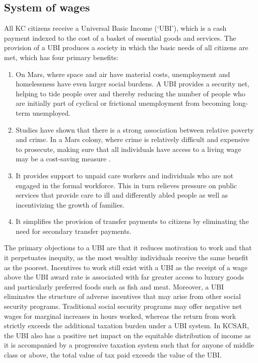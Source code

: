 \documentclass[fleqn,10pt]{Stylesheet} %
\begin{document}
\subsection{System of wages}
All KC citizens receive a Universal Basic Income (‘UBI’), which is a cash payment indexed to the cost of a basket of essential goods and services. The provision of a UBI produces a society in which the basic needs of all citizens are met, which has four primary benefits: 

\begin{enumerate}
    \item On Mars, where space and air have material costs, unemployment and homelessness have even larger social burdens. A UBI provides a security net, helping to tide people over and thereby reducing the number of people who are initially part of cyclical or frictional unemployment from becoming long-term unemployed.
    \item Studies have shown that there is a strong association between relative poverty and crime. In a Mars colony, where crime is relatively difficult and expensive to prosecute, making sure that all individuals have access to a living wage may be a cost-saving measure \cite{Hooghe}.
    \item It provides support to unpaid care workers and individuals who are not engaged in the formal workforce. This in turn relieves pressure on public services that provide care to ill and differently abled people as well as incentivizing the growth of families.  
    \item It simplifies the provision of transfer payments to citizens by eliminating the need for secondary transfer payments. 
\end{enumerate}

The primary objections to a UBI are that it reduces motivation to work and that it perpetuates inequity, as the most wealthy individuals receive the same benefit as the poorest. Incentives to work still exist with a UBI as the receipt of a wage above the UBI award rate is associated with far greater access to luxury goods and particularly preferred foods such as fish and meat. Moreover, a UBI eliminates the structure of adverse incentives that may arise from other social security programs. Traditional social security programs may offer negative net wages for marginal increases in hours worked, whereas the return from work strictly exceeds the additional taxation burden under a UBI system. In KCSAR, the UBI also has a positive net impact on the equitable distribution of income as it is accompanied by a progressive taxation system such that for anyone of middle class or above, the total value of tax paid exceeds the value of the UBI. 
\end{document}
